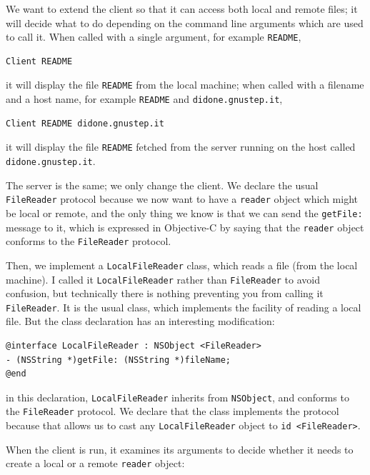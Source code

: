 \documentclass[a4paper]{article}
\begin{document}
We want to extend the client so that it can access both local and
remote files; it will decide what to do depending on the command line
arguments which are used to call it.  When called with a single
argument, for example \texttt{README},
\begin{verbatim}
Client README
\end{verbatim}
it will display the file \texttt{README} from the local machine; when
called with a filename and a host name, for example \texttt{README} and
\texttt{didone.gnustep.it},
\begin{verbatim}
Client README didone.gnustep.it
\end{verbatim}
it will display the file \texttt{README} fetched from the server
running on the host called \texttt{didone.gnustep.it}.

The server is the same; we only change the client.  We declare the
usual \texttt{FileReader} protocol because we now want to have a
\texttt{reader} object which might be local or remote, and the only
thing we know is that we can send the \texttt{getFile:} message to it,
which is expressed in Objective-C by saying that the \texttt{reader}
object conforms to the \texttt{FileReader} protocol.

Then, we implement a \texttt{LocalFileReader} class, which reads a
file (from the local machine).  I called it \texttt{LocalFileReader}
rather than \texttt{FileReader} to avoid confusion, but technically
there is nothing preventing you from calling it \texttt{FileReader}.
It is the usual class, which implements the facility of reading a
local file.  But the class declaration has an interesting
modification:
\begin{verbatim}
@interface LocalFileReader : NSObject <FileReader>
- (NSString *)getFile: (NSString *)fileName;
@end
\end{verbatim}
in this declaration, \texttt{LocalFileReader} inherits from
\texttt{NSObject}, and conforms to the \texttt{FileReader} protocol.
We declare that the class implements the protocol because that allows
us to cast any \texttt{LocalFileReader} object to \texttt{id
  <FileReader>}.

When the client is run, it examines its arguments to decide whether it
needs to create a local or a remote \texttt{reader} object:
 
\end{document}

